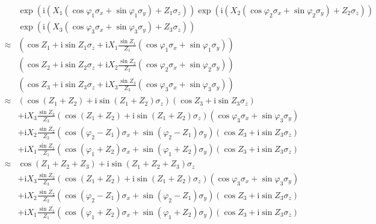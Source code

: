 \documentclass[10pt,fleqn]{article}
\newcommand{\ui}{\mathrm{i}}
\newcommand{\eqar}[1]
{
  \begin{align*}
    #1
  \end{align*}
}
\newcommand{\paren}[1]{{\left({#1}\right)}}
\begin{document}
\eqar{
  &\exp\paren{\ui\paren{X_1\paren{\cos\varphi_1\sigma_x+\sin\varphi_1\sigma_y}+Z_1\sigma_z}}\exp\paren{\ui\paren{X_2\paren{\cos\varphi_2\sigma_x+\sin\varphi_2\sigma_y}+Z_2\sigma_z}}\\
  &\exp\paren{\ui\paren{X_3\paren{\cos\varphi_3\sigma_x+\sin\varphi_3\sigma_y}+Z_3\sigma_z}}\\
  \approx&\paren{\cos Z_1+\ui\sin Z_1\sigma_z+\ui X_1\frac{\sin Z_1}{Z_1}\paren{\cos\varphi_1\sigma_x+\sin\varphi_1\sigma_y}}\\
  &\paren{\cos Z_2+\ui\sin Z_2\sigma_z+\ui X_2\frac{\sin Z_2}{Z_2}\paren{\cos\varphi_2\sigma_x+\sin\varphi_2\sigma_y}}\\
  &\paren{\cos Z_3+\ui\sin Z_3\sigma_z+\ui X_3\frac{\sin Z_3}{Z_3}\paren{\cos\varphi_3\sigma_x+\sin\varphi_3\sigma_y}}\\
  \approx&
  \paren{\cos\paren{Z_1+Z_2}+\ui\sin\paren{Z_1+Z_2}\sigma_z}\paren{\cos Z_3+\ui\sin Z_3\sigma_z}\\
  &+\ui X_3\frac{\sin Z_3}{Z_3}\paren{\cos\paren{Z_1+Z_2}+\ui\sin\paren{Z_1+Z_2}\sigma_z}\paren{\cos\varphi_3\sigma_x+\sin\varphi_3\sigma_y}\\
  &
  +\ui X_2\frac{\sin Z_2}{Z_2}\paren{
    \cos\paren{\varphi_2-Z_1}\sigma_x
    +\sin\paren{\varphi_2-Z_1}\sigma_y
  }\paren{\cos Z_3+\ui\sin Z_3\sigma_z}
  \\
  &+\ui X_1\frac{\sin Z_1}{Z_1}
  \paren{\cos\paren{\varphi_1+Z_2}\sigma_x+\sin\paren{\varphi_1+Z_2}\sigma_y}\paren{\cos Z_3+\ui\sin Z_3\sigma_z}
  \\
  \approx&\cos\paren{Z_1+Z_2+Z_3}+\ui\sin\paren{Z_1+Z_2+Z_3}\sigma_z\\
  &+\ui X_3\frac{\sin Z_3}{Z_3}\paren{\cos\paren{Z_1+Z_2}+\ui\sin\paren{Z_1+Z_2}\sigma_z}\paren{\cos\varphi_3\sigma_x+\sin\varphi_3\sigma_y}\\
  &
  +\ui X_2\frac{\sin Z_2}{Z_2}\paren{
    \cos\paren{\varphi_2-Z_1}\sigma_x
    +\sin\paren{\varphi_2-Z_1}\sigma_y
  }\paren{\cos Z_3+\ui\sin Z_3\sigma_z}
  \\
  &+\ui X_1\frac{\sin Z_1}{Z_1}
  \paren{\cos\paren{\varphi_1+Z_2}\sigma_x+\sin\paren{\varphi_1+Z_2}\sigma_y}\paren{\cos Z_3+\ui\sin Z_3\sigma_z}
  \\
}
\end{document}

